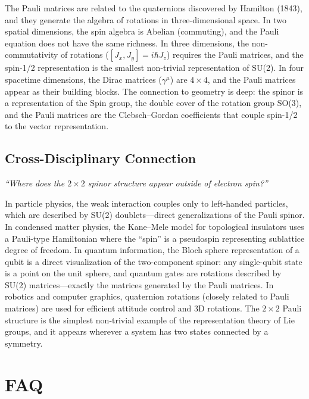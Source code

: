 The Pauli matrices are related to the quaternions discovered by Hamilton (1843), and they generate the algebra of rotations in three-dimensional space. In two spatial dimensions, the spin algebra is Abelian (commuting), and the Pauli equation does not have the same richness. In three dimensions, the non-commutativity of rotations ($[J_{x}, J_{y}] = i\hbar J_{z}$) requires the Pauli matrices, and the spin-1/2 representation is the smallest non-trivial representation of SU(2). In four spacetime dimensions, the Dirac matrices ($\gamma^{\mu}$) are $4 \times 4$, and the Pauli matrices appear as their building blocks. The connection to geometry is deep: the spinor is a representation of the Spin group, the double cover of the rotation group SO(3), and the Pauli matrices are the Clebsch--Gordan coefficients that couple spin-1/2 to the vector representation.

\subsection*{Cross-Disciplinary Connection}
\textit{``Where does the $2 \times 2$ spinor structure appear outside of electron spin?''}

In particle physics, the weak interaction couples only to left-handed particles, which are described by SU(2) doublets---direct generalizations of the Pauli spinor. In condensed matter physics, the Kane--Mele model for topological insulators uses a Pauli-type Hamiltonian where the ``spin'' is a pseudospin representing sublattice degree of freedom. In quantum information, the Bloch sphere representation of a qubit is a direct visualization of the two-component spinor: any single-qubit state is a point on the unit sphere, and quantum gates are rotations described by SU(2) matrices---exactly the matrices generated by the Pauli matrices. In robotics and computer graphics, quaternion rotations (closely related to Pauli matrices) are used for efficient attitude control and 3D rotations. The $2 \times 2$ Pauli structure is the simplest non-trivial example of the representation theory of Lie groups, and it appears wherever a system has two states connected by a symmetry.

\section*{FAQ}

